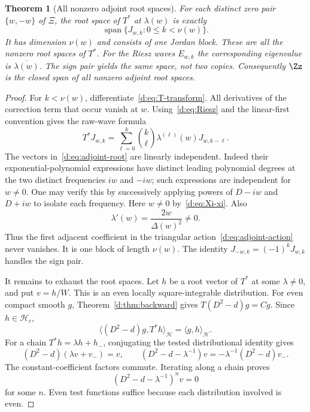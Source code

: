 \documentclass[11pt,a4paper]{article}
\numberwithin{equation}{section}
\newtheorem{theorem}{Theorem}[section]
\theoremstyle{definition}\newtheorem{definition}[theorem]{Definition}
\theoremstyle{remark}\newtheorem{remark}[theorem]{Remark}
\newcommand{\Hh}{\mathcal H}\newcommand{\Hw}{\mathcal H}
\newcommand{\ip}[2]{\langle#1,#2\rangle}\newcommand{\norm}[1]{\lVert#1\rVert}\newcommand{\abs}[1]{\lvert#1\rvert}
\begin{document}
\begin{theorem}[All nonzero adjoint root spaces]\label{d:thm:adjoint}
For each distinct zero pair $\{w,-w\}$ of $\Xi$, the root space of $T^*$ at $\lambda(w)$ is exactly
\begin{equation}\label{d:eq:adjoint-root}
 \operatorname{span}\{J_{w,k}:0\le k<\nu(w)\}.
\end{equation}
It has dimension $\nu(w)$ and consists of one Jordan block. These are all the nonzero root spaces of $T^*$. For the Riesz waves $E_{w,k}$ the corresponding eigenvalue is $\overline{\lambda(w)}$. The sign pair yields the same space, not two copies. Consequently $\Zz$ is the closed span of all nonzero adjoint root spaces.
\end{theorem}
\begin{proof}
For $k<\nu(w)$, differentiate~\eqref{d:eq:T-transform}. All derivatives of the correction term that occur vanish at $w$. Using~\eqref{d:eq:Riesz} and the linear-first convention gives the raw-wave formula
\begin{equation}\label{d:eq:adjoint-action}
 T^*J_{w,k}=\sum_{\ell=0}^k\binom{k}{\ell}
 \lambda^{(\ell)}(w)J_{w,k-\ell}.
\end{equation}
The vectors in~\eqref{d:eq:adjoint-root} are linearly independent. Indeed their exponential-polynomial expressions have distinct leading polynomial degrees at the two distinct frequencies $iw$ and $-iw$; such expressions are independent for $w\ne0$. One may verify this by successively applying powers of $D-iw$ and $D+iw$ to isolate each frequency. Here $w\ne0$ by~\eqref{d:eq:Xi-xi}. Also
\[
 \lambda'(w)=\frac{2w}{\Delta(w)^2}\ne0.
\]
Thus the first adjacent coefficient in the triangular action~\eqref{d:eq:adjoint-action} never vanishes. It is one block of length $\nu(w)$. The identity $J_{-w,k}=(-1)^kJ_{w,k}$ handles the sign pair.

It remains to exhaust the root spaces. Let $h$ be a root vector of $T^*$ at some $\lambda\ne0$, and put $v=h/W$. This is an even locally square-integrable distribution. For even compact smooth $g$, Theorem~\ref{d:thm:backward} gives $T(D^2-d)g=Cg$. Since $h\in\Hh_c$,
\begin{equation}\label{d:eq:root-test}
 \ip{(D^2-d)g}{T^*h}_{\Hh}=\ip{g}{h}_{\Hh}.
\end{equation}
For a chain $T^*h=\lambda h+h_-$, conjugating the tested distributional identity gives
\[
 (D^2-d)(\lambda v+v_-)=v,
 \qquad (D^2-d-\lambda^{-1})v=-\lambda^{-1}(D^2-d)v_-.
\]
The constant-coefficient factors commute. Iterating along a chain proves
\begin{equation}\label{d:eq:root-ODE}
 (D^2-d-\lambda^{-1})^n v=0
\end{equation}
for some $n$. Even test functions suffice because each distribution involved is even.


\end{proof}
\end{document}
